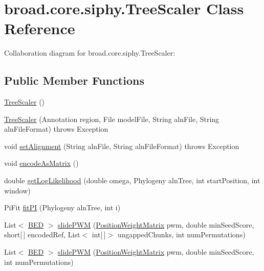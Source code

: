 \hypertarget{classbroad_1_1core_1_1siphy_1_1_tree_scaler}{\section{broad.\+core.\+siphy.\+Tree\+Scaler Class Reference}
\label{classbroad_1_1core_1_1siphy_1_1_tree_scaler}
}


Collaboration diagram for broad.\+core.\+siphy.\+Tree\+Scaler\+:
\subsection*{Public Member Functions}
\begin{DoxyCompactItemize}
\item 
\hyperlink{classbroad_1_1core_1_1siphy_1_1_tree_scaler_a1dc6146834dbaaa5fe6e296a3dce26fa}{Tree\+Scaler} ()
\item 
\hyperlink{classbroad_1_1core_1_1siphy_1_1_tree_scaler_a39b4829a2c7f0c89acadac2393049725}{Tree\+Scaler} (Annotation region, File model\+File, String aln\+File, String aln\+File\+Format)  throws Exception
\item 
void \hyperlink{classbroad_1_1core_1_1siphy_1_1_tree_scaler_a957d50f0314cbdbea117d7bdb6595b01}{set\+Alignment} (String aln\+File, String aln\+File\+Format)  throws Exception
\item 
void \hyperlink{classbroad_1_1core_1_1siphy_1_1_tree_scaler_a7b8630a9b05c5efc4e00276fa0a95831}{encode\+As\+Matrix} ()
\item 
double \hyperlink{classbroad_1_1core_1_1siphy_1_1_tree_scaler_aa28eca418572c1475df5d267edaa9487}{get\+Log\+Likelihood} (double omega, Phylogeny aln\+Tree, int start\+Position, int window)
\item 
Pi\+Fit \hyperlink{classbroad_1_1core_1_1siphy_1_1_tree_scaler_a37ff6aa0bde1d0506362c6b515cc312c}{fit\+P\+I} (Phylogeny aln\+Tree, int i)
\item 
List$<$ \hyperlink{classbroad_1_1core_1_1annotation_1_1_b_e_d}{B\+E\+D} $>$ \hyperlink{classbroad_1_1core_1_1siphy_1_1_tree_scaler_ab203584b3ace8a8a7c80781f94dde180}{slide\+P\+W\+M} (\hyperlink{classbroad_1_1core_1_1motif_1_1_position_weight_matrix}{Position\+Weight\+Matrix} pwm, double min\+Seed\+Score, short\mbox{[}$\,$\mbox{]} encoded\+Ref, List$<$ int\mbox{[}$\,$\mbox{]}$>$ ungapped\+Chunks, int num\+Permutations)
\item 
List$<$ \hyperlink{classbroad_1_1core_1_1annotation_1_1_b_e_d}{B\+E\+D} $>$ \hyperlink{classbroad_1_1core_1_1siphy_1_1_tree_scaler_a45de3c44b31473586a9783d20de81554}{slide\+P\+W\+M} (\hyperlink{classbroad_1_1core_1_1motif_1_1_position_weight_matrix}{Position\+Weight\+Matrix} pwm, double min\+Seed\+Score, int num\+Permutations)

\end{DoxyCompactItemize}
